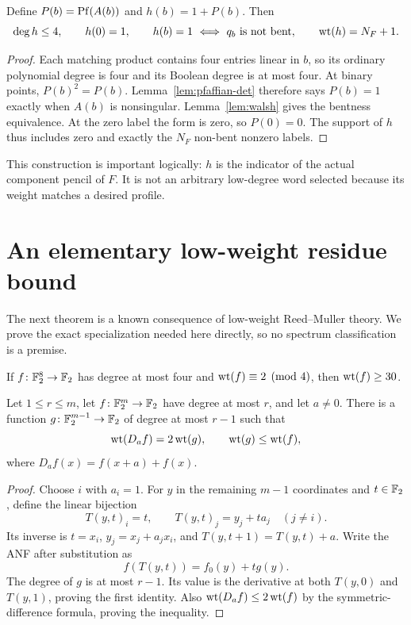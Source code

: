 \begin{proposition}\label{prop:indicator}
Define $P(b)=\operatorname{Pf}(A(b))$ and $h(b)=1+P(b)$. Then
\begin{equation}\label{eq:indicator-properties}
\deg h\le4,\qquad h(0)=1,\qquad
h(b)=1\ \Longleftrightarrow\ q_b\text{ is not bent},
\qquad \operatorname{wt}(h)=N_F+1.
\end{equation}
\end{proposition}
\begin{proof}
Each matching product contains four entries linear in $b$, so its ordinary polynomial degree is four and its Boolean degree is at most four. At binary points, $P(b)^2=P(b)$. Lemma~\ref{lem:pfaffian-det} therefore says $P(b)=1$ exactly when $A(b)$ is nonsingular. Lemma~\ref{lem:walsh} gives the bentness equivalence. At the zero label the form is zero, so $P(0)=0$. The support of $h$ thus includes zero and exactly the $N_F$ non-bent nonzero labels.
\end{proof}
This construction is important logically: $h$ is the indicator of the actual component pencil of $F$. It is not an arbitrary low-degree word selected because its weight matches a desired profile.

\section{An elementary low-weight residue bound}\label{sec:residue}
The next theorem is a known consequence of low-weight Reed--Muller theory. We prove the exact specialization needed here directly, so no spectrum classification is a premise.

\begin{theorem}\label{thm:residue}
If $f\colon\mathbb F_2^8\to\mathbb F_2$ has degree at most four and $\operatorname{wt}(f)\equiv2\pmod4$, then $\operatorname{wt}(f)\ge30$.
\end{theorem}

\begin{lemma}\label{lem:descent}
Let $1\le r\le m$, let $f\colon\mathbb F_2^m\to\mathbb F_2$ have degree at most $r$, and let $a\ne0$. There is a function $g\colon\mathbb F_2^{m-1}\to\mathbb F_2$ of degree at most $r-1$ such that
\begin{equation}\label{eq:descent}
\operatorname{wt}(D_a f)=2\operatorname{wt}(g),\qquad \operatorname{wt}(g)\le\operatorname{wt}(f),
\end{equation}
where $D_a f(x)=f(x+a)+f(x)$.
\end{lemma}
\begin{proof}
Choose $i$ with $a_i=1$. For $y$ in the remaining $m-1$ coordinates and $t\in\mathbb F_2$, define the linear bijection
\[
T(y,t)_i=t,\qquad T(y,t)_j=y_j+t a_j\quad(j\ne i).
\]
Its inverse is $t=x_i$, $y_j=x_j+a_jx_i$, and $T(y,t+1)=T(y,t)+a$. Write the ANF after substitution as
\[
f(T(y,t))=f_0(y)+t g(y).
\]
The degree of $g$ is at most $r-1$. Its value is the derivative at both $T(y,0)$ and $T(y,1)$, proving the first identity. Also $\operatorname{wt}(D_a f)\le2\operatorname{wt}(f)$ by the symmetric-difference formula, proving the inequality.
\end{proof}

